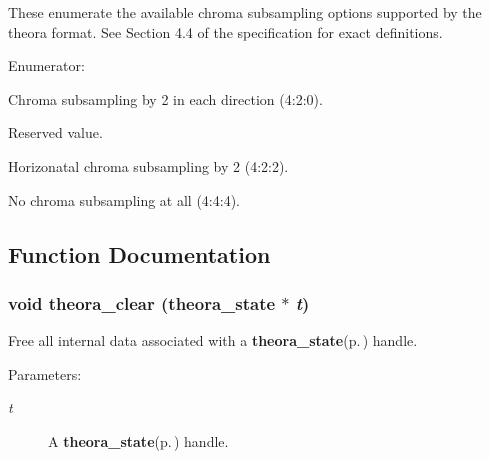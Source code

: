 These enumerate the available chroma subsampling options supported by the theora format. See Section 4.4 of the specification for exact definitions. \begin{Desc}
\item[Enumerator: ]\par
\begin{description}
\item[{\em 
OC\_\-PF\_\-420\label{theora_8h_e6d5fa4a952719a002d8df5ba19fd7d3ba38f832e52748c1df744683c15fe05b}
}]Chroma subsampling by 2 in each direction (4:2:0). \item[{\em 
OC\_\-PF\_\-RSVD\label{theora_8h_e6d5fa4a952719a002d8df5ba19fd7d317351a1b9c53cd886ad34c3b1d3bd7b3}
}]Reserved value. \item[{\em 
OC\_\-PF\_\-422\label{theora_8h_e6d5fa4a952719a002d8df5ba19fd7d3c841320c974a9704f146d52d08f31cb0}
}]Horizonatal chroma subsampling by 2 (4:2:2). \item[{\em 
OC\_\-PF\_\-444\label{theora_8h_e6d5fa4a952719a002d8df5ba19fd7d3a2c8a52c7c2e20fac7b0182579e89144}
}]No chroma subsampling at all (4:4:4). \end{description}
\end{Desc}



\subsection{Function Documentation}
\subsubsection{\setlength{\rightskip}{0pt plus 5cm}void theora\_\-clear ({\bf theora\_\-state} $\ast$ {\em t})}\label{theora_8h_c3d872f1cbe57918661471cf41fe2949}


Free all internal data associated with a {\bf theora\_\-state}{\rm (p.\,\pageref{structtheora__state})} handle. 

\begin{Desc}
\item[Parameters:]
\begin{description}
\item[{\em t}]A {\bf theora\_\-state}{\rm (p.\,\pageref{structtheora__state})} handle. \end{description}
\end{Desc}
